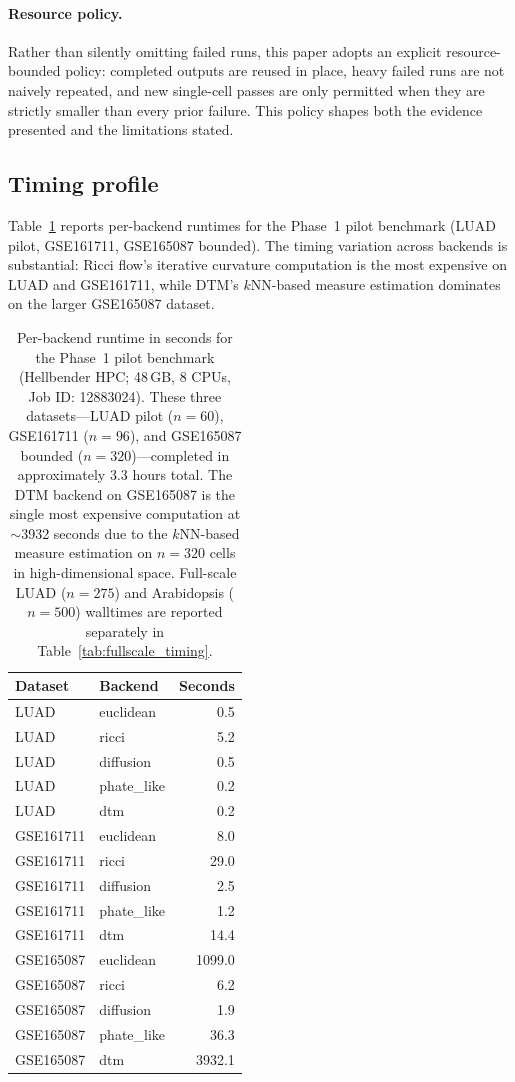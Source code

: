 \documentclass[11pt]{article}
\begin{document}
\paragraph{Resource policy.}
Rather than silently omitting failed runs, this paper adopts an explicit resource-bounded policy: completed outputs are reused in place, heavy failed runs are not naively repeated, and new single-cell passes are only permitted when they are strictly smaller than every prior failure.
This policy shapes both the evidence presented and the limitations stated.

\subsection{Timing profile}

Table~\ref{tab:timing} reports per-backend runtimes for the Phase~1 pilot benchmark (LUAD pilot, GSE161711, GSE165087 bounded).
The timing variation across backends is substantial: Ricci flow's iterative curvature computation is the most expensive on LUAD and GSE161711, while DTM's $k$NN-based measure estimation dominates on the larger GSE165087 dataset.

\begin{table}[h]
\centering
\small
\begin{tabular}{llr}
\toprule
Dataset & Backend & Seconds \\
\midrule
LUAD & euclidean & 0.5 \\
LUAD & ricci & 5.2 \\
LUAD & diffusion & 0.5 \\
LUAD & phate\_like & 0.2 \\
LUAD & dtm & 0.2 \\
\midrule
GSE161711 & euclidean & 8.0 \\
GSE161711 & ricci & 29.0 \\
GSE161711 & diffusion & 2.5 \\
GSE161711 & phate\_like & 1.2 \\
GSE161711 & dtm & 14.4 \\
\midrule
GSE165087 & euclidean & 1099.0 \\
GSE165087 & ricci & 6.2 \\
GSE165087 & diffusion & 1.9 \\
GSE165087 & phate\_like & 36.3 \\
GSE165087 & dtm & 3932.1 \\
\bottomrule
\end{tabular}
\caption{Per-backend runtime in seconds for the Phase~1 pilot benchmark (Hellbender HPC; 48\,GB, 8 CPUs, Job ID: 12883024).
These three datasets---LUAD pilot ($n = 60$), GSE161711 ($n = 96$), and GSE165087 bounded ($n = 320$)---completed in approximately 3.3 hours total.
The DTM backend on GSE165087 is the single most expensive computation at ${\sim}$3932 seconds due to the $k$NN-based measure estimation on $n = 320$ cells in high-dimensional space.
Full-scale LUAD ($n = 275$) and Arabidopsis ($n = 500$) walltimes are reported separately in Table~\ref{tab:fullscale_timing}.}
\label{tab:timing}
\end{table}
\end{document}

